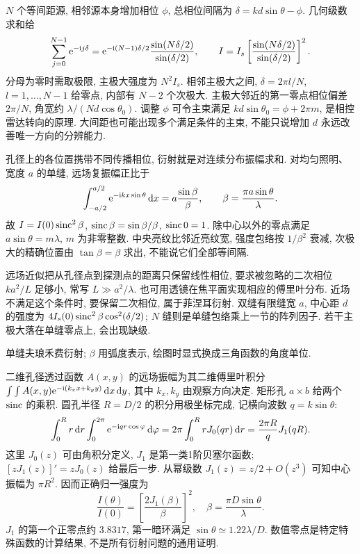 $N$ 个等间距源, 相邻源本身增加相位 $\phi$, 总相位间隔为 $\delta=kd\sin\theta-\phi$. 几何级数求和给
\[
\sum_{j=0}^{N-1}\mathrm e^{-\mathrm i j\delta}
=\mathrm e^{-\mathrm i(N-1)\delta/2}\frac{\sin(N\delta/2)}{\sin(\delta/2)},\qquad
I=I_s\left[\frac{\sin(N\delta/2)}{\sin(\delta/2)}\right]^2.
\]
分母为零时需取极限, 主极大强度为 $N^2I_s$. 相邻主极大之间, $\delta=2\pi l/N$, $l=1,\ldots,N-1$ 给零点, 内部有 $N-2$ 个次极大. 主极大邻近的第一零点相位偏差 $2\pi/N$, 角宽约 $\lambda/(Nd\cos\theta_0)$. 调整 $\phi$ 可令主束满足 $kd\sin\theta_0=\phi+2\pi m$, 是相控雷达转向的原理. 大间距也可能出现多个满足条件的主束, 不能只说增加 $d$ 永远改善唯一方向的分辨能力.

孔径上的各位置携带不同传播相位, 衍射就是对连续分布振幅求和. 对均匀照明、宽度 $a$ 的单缝, 远场复振幅正比于
\[
\int_{-a/2}^{a/2}\mathrm e^{-\mathrm i kx\sin\theta}\,\mathrm d x
=a\frac{\sin\beta}{\beta},\qquad \beta=\frac{\pi a\sin\theta}{\lambda}.
\]
故 $I=I(0)\operatorname{sinc}^2\beta$, $\operatorname{sinc}\beta=\sin\beta/\beta$, $\operatorname{sinc}0=1$. 除中心以外的零点满足 $a\sin\theta=m\lambda$, $m$ 为非零整数. 中央亮纹比邻近亮纹宽, 强度包络按 $1/\beta^2$ 衰减, 次极大的精确位置由 $\tan\beta=\beta$ 求出, 不能说它们全部等间隔.

远场近似把从孔径点到探测点的距离只保留线性相位, 要求被忽略的二次相位 $ka^2/L$ 足够小, 常写 $L\gg a^2/\lambda$. 也可用透镜在焦平面实现相应的傅里叶分布. 近场不满足这个条件时, 要保留二次相位, 属于菲涅耳衍射. 双缝有限缝宽 $a$, 中心距 $d$ 的强度为 $4I_s(0)\operatorname{sinc}^2\beta\cos^2(\delta/2)$; $N$ 缝则是单缝包络乘上一节的阵列因子. 若干主极大落在单缝零点上, 会出现缺级.

\begin{center}
\par
单缝夫琅禾费衍射; $\beta$ 用弧度表示, 绘图时显式换成三角函数的角度单位.
\end{center}

二维孔径透过函数 $A(x,y)$ 的远场振幅为其二维傅里叶积分 $\int\int A(x,y)\mathrm e^{-\mathrm i(k_xx+k_yy)}\,\mathrm d x\,\mathrm d y$, 其中 $k_x,k_y$ 由观察方向决定. 矩形孔 $a\times b$ 给两个 $\operatorname{sinc}$ 的乘积. 圆孔半径 $R=D/2$ 的积分用极坐标完成, 记横向波数 $q=k\sin\theta$:
\[
\int_0^Rr\,\mathrm d r\int_0^{2\pi}\mathrm e^{-\mathrm i qr\cos\varphi}\,\mathrm d\varphi
=2\pi\int_0^RrJ_0(qr)\,\mathrm d r
=\frac{2\pi R}{q}J_1(qR).
\]
这里 $J_0(z)$ 可由角积分定义, $J_1$ 是第一类1阶贝塞尔函数; $[zJ_1(z)]'=zJ_0(z)$ 给最后一步. 从幂级数 $J_1(z)=z/2+O(z^3)$ 可知中心振幅为 $\pi R^2$. 因而正确归一强度为
\[
\frac{I(\theta)}{I(0)}=\left[\frac{2J_1(\beta)}{\beta}\right]^2,
\quad \beta=\frac{\pi D\sin\theta}{\lambda}.
\]
$J_1$ 的第一个正零点约 $3.8317$, 第一暗环满足 $\sin\theta\simeq1.22\lambda/D$. 数值零点是特定特殊函数的计算结果, 不是所有衍射问题的通用证明.

